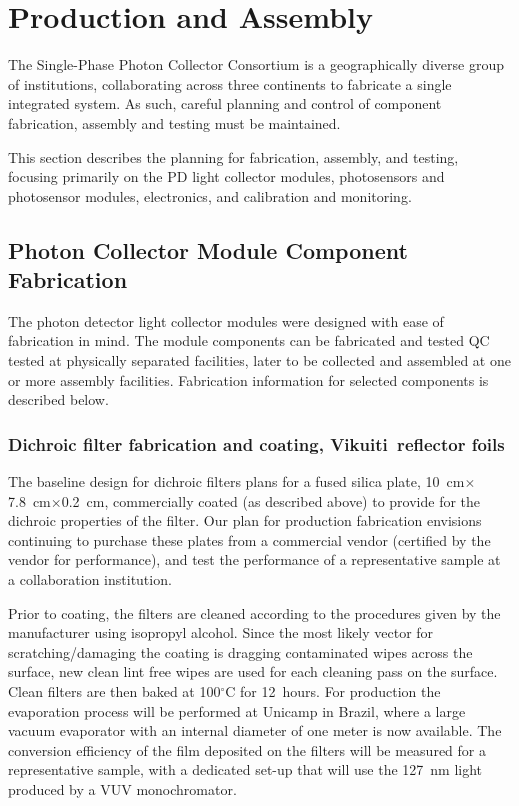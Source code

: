 \section{Production and Assembly}
\label{sec:fdsp-pd-prod-assy}

The Single-Phase Photon Collector Consortium is a geographically diverse group of institutions, collaborating across three continents to fabricate a single integrated system.  As such, careful planning and control of component fabrication, assembly and testing must be maintained.

This section describes the planning for fabrication, assembly, and testing, focusing primarily on the PD light collector modules, photosensors and photosensor modules, electronics, and calibration and monitoring.

\subsection{Photon Collector Module Component Fabrication}
The photon detector light collector modules were designed with ease of fabrication in mind.  The module components can be fabricated and tested QC tested at physically separated facilities, later to be collected and assembled at one or more assembly facilities.  Fabrication information for selected components is described below.

\subsubsection{Dichroic filter fabrication and coating, Vikuiti\texttrademark\ reflector foils}

The baseline design for dichroic filters plans for a fused silica plate,  \SI{10}{cm}$\times$\SI{7.8}{cm}$\times$\SI{0.2}{cm}, commercially coated (as described above) to provide for the dichroic properties of the filter.  Our plan for production fabrication envisions continuing to purchase these plates from a commercial vendor (certified by the vendor for performance), and test the performance of a representative sample at a collaboration institution.  

Prior to coating, the filters are cleaned according to the procedures given by the manufacturer using isopropyl alcohol. Since the most likely vector for scratching/damaging the coating is dragging contaminated wipes across the surface, new clean lint free wipes are used for each  cleaning pass on the surface. Clean filters are then baked at 100$^\circ$C for \SI{12}{hours}. 
For   production the evaporation process will be performed at Unicamp in Brazil, 
 where a large vacuum evaporator with an internal diameter of one meter is now available. The conversion efficiency of the film deposited on the filters will be measured for a representative sample, with a dedicated set-up that will use the \SI{127}{nm} light produced by a VUV monochromator.

